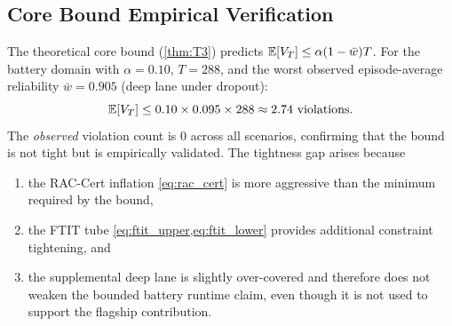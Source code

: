 \subsection{Core Bound Empirical Verification}

The theoretical core bound (\cref{thm:T3}) predicts $\mathbb{E}[V_T] \le \alpha(1-\bar{w})T$.
For the battery domain with $\alpha = 0.10$, $T = 288$, and the worst observed
episode-average reliability $\bar{w} = 0.905$ (deep lane under dropout):
\[
  \mathbb{E}[V_T] \le 0.10 \times 0.095 \times 288 \approx 2.74 \text{ violations.}
\]
The \emph{observed} violation count is 0 across all scenarios, confirming that the
bound is not tight but is empirically validated.  The tightness gap arises because
\begin{enumerate}[nosep]
  \item the RAC-Cert inflation \cref{eq:rac_cert} is more aggressive than the
        minimum required by the bound,
  \item the FTIT tube \cref{eq:ftit_upper,eq:ftit_lower} provides additional
        constraint tightening, and
  \item the supplemental deep lane is slightly over-covered and therefore does not
        weaken the bounded battery runtime claim, even though it is not used to
        support the flagship contribution.
\end{enumerate}
